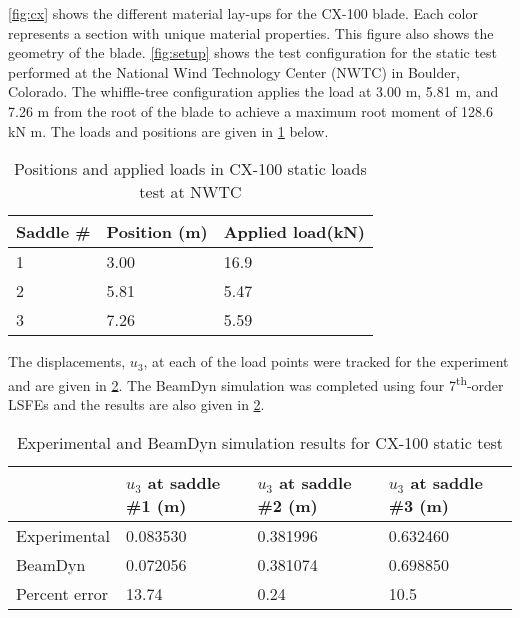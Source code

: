 \documentclass[letterpaper,12pt]{article}
\begin{document}
\ref{fig:cx} \cite{paquette2006modeling} shows the different material lay-ups for the CX-100 blade. Each color represents a section with unique material properties. This figure also shows the geometry of the blade. \ref{fig:setup} \cite{paquette2006modeling} shows the test configuration for the static test performed at the National Wind Technology Center (NWTC) in Boulder, Colorado. The whiffle-tree configuration applies the load at 3.00 m, 5.81 m, and 7.26 m from the root of the blade to achieve a maximum root moment of 128.6 kN m. The loads and positions are given in \ref{tab:cx} below.





\begin{table} 
\caption{\label{tab:cx}Positions and applied loads in CX-100 static loads test at NWTC  } 
\begin{center}
    \begin{tabular}{| l | l |l |}
    	\hline
    	 Saddle \# &     Position (m) & Applied load(kN)  \\ \hline
    1&	3.00 & 16.9         \\  \hline
    2&	5.81   & 5.47         \\ \hline
    3&	    	7.26   & 5.59         \\ \hline
    \end{tabular}
\end{center}
\end{table}
\newpage

The displacements, $u_3$, at each of the load points were tracked for the experiment and are given in \ref{tab:results}. The BeamDyn simulation was completed using four 7\textsuperscript{th}-order LSFEs and the results are also given in \ref{tab:results}.

\begin{table} [H]
\caption{\label{tab:results}Experimental and BeamDyn simulation results for CX-100 static test  } 
\begin{center}
    \begin{tabular}{| l | l | l | l |}
    	\hline
    	             & $u_3$ at saddle \#1 (m) & $u_3$ at saddle \#2 (m) & $u_3$ at saddle \#3 (m) \\ \hline
    	Experimental & 0.083530             & 0.381996               & 0.632460             \\ \hline
    	BeamDyn      & 0.072056               & 0.381074                & 0.698850           \\ \hline
    	    	Percent error      &        13.74        & 0.24                & 10.5           \\ \hline
    \end{tabular}
\end{center}
\end{table} 
\end{document}
